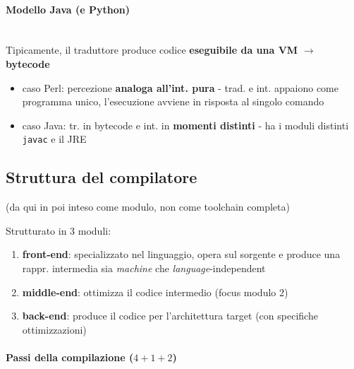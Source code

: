 \paragraph{Modello Java (e Python)}~\\

Tipicamente, il traduttore produce codice \textbf{eseguibile da una VM} $\rightarrow$ \textbf{bytecode}

\begin{emphasize}
    \begin{itemize}
      \item caso Perl: percezione \textbf{analoga all'int. pura} - trad. e int. appaiono come programma unico, l'esecuzione avviene in risposta al singolo comando
      \item caso Java: tr. in bytecode e int. in \textbf{momenti distinti} - ha i moduli distinti \lstinline|javac| e il JRE
    \end{itemize}
    
\end{emphasize}


\subsection{Struttura del compilatore}

(da qui in poi inteso come modulo, non come toolchain completa)

Strutturato in 3 moduli:
\begin{enumerate}
  \item \textbf{front-end}: specializzato nel linguaggio, opera sul sorgente e produce una rappr. intermedia sia \textit{machine} che \textit{language}-independent
  \item \textbf{middle-end}: ottimizza il codice intermedio (focus modulo 2)
  \item \textbf{back-end}: produce il codice per l'architettura target (con specifiche ottimizzazioni)
\end{enumerate}

\paragraph{Passi della compilazione ($4+1+2$)}~\\

